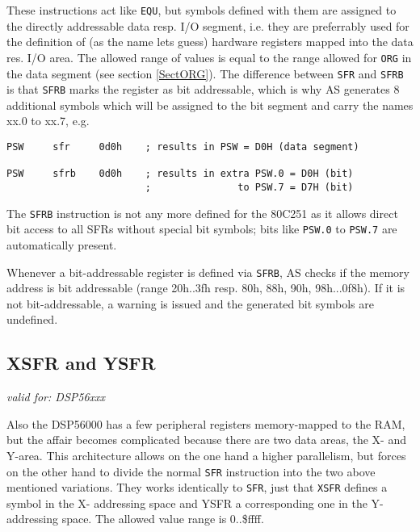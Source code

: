 \documentclass[12pt,twoside]{report}
\makeatletter
\newcommand{\tty}[1]{{\tt #1}}
\newcommand{\ttindex}[1]{\index{#1@{\tt #1}}}
\newcommand{\asname}{{AS}}
\makeatother
\begin{document}
These instructions act like \tty{EQU}, but symbols defined with them are
assigned to the directly addressable data resp. I/O segment, i.e. they are
preferrably used for the definition of (as the name lets guess) hardware
registers mapped into the data res. I/O area.  The allowed range of values
is equal to the range allowed for \tty{ORG} in the data segment (see
section \ref{SectORG}).  The difference between \tty{SFR} and \tty{SFRB}
is that \tty{SFRB} marks the register as bit addressable, which is why \asname{}
generates 8 additional symbols which will be assigned to the bit segment
and carry the names xx.0 to xx.7, e.g.
\begin{verbatim}
PSW     sfr     0d0h    ; results in PSW = D0H (data segment)

PSW     sfrb    0d0h    ; results in extra PSW.0 = D0H (bit)
                        ;               to PSW.7 = D7H (bit)
\end{verbatim}
The \tty{SFRB} instruction is not any more defined for the 80C251 as it
allows direct bit access to all SFRs without special bit symbols; bits
like \tty{PSW.0} to \tty{PSW.7} are automatically present.

Whenever a bit-addressable register is defined via \tty{SFRB}, \asname{} checks
if the memory address is bit addressable (range 20h..3fh resp. 80h, 88h,
90h, 98h...0f8h).  If it is not bit-addressable, a warning is issued and
the generated bit symbols are undefined.


\subsection{XSFR and YSFR}
\ttindex{XSFR}\ttindex{YSFR}

{\em valid for: DSP56xxx}

Also the DSP56000 has a few peripheral registers memory-mapped to the RAM,
but the affair becomes complicated because there are two data areas, the
X- and Y-area.  This architecture allows on the one hand a higher
parallelism, but forces on the other hand to divide the normal \tty{SFR}
instruction into the two above mentioned variations.  They works
identically to \tty{SFR}, just that \tty{XSFR} defines a symbol in the X-
addressing space and YSFR a corresponding one in the Y-addressing space.
The allowed value range is 0..\$ffff.

\end{document}

